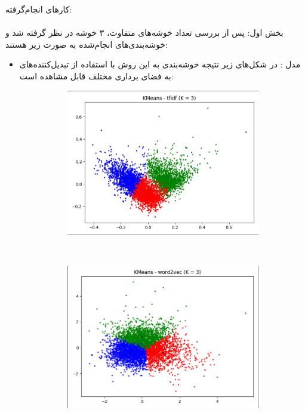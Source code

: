 \documentclass[11pt]{article}
\begin{document}
کارهای انجام‌گرفته: \\ \\
بخش اول: پس از بررسی تعداد خوشه‌های متفاوت، ۳ خوشه در نظر گرفته شد و خوشه‌بندی‌های انجام‌شده به صورت زیر هستند: \\
\begin{itemize}
\item 
مدل  : در شکل‌های زیر نتیجه خوشه‌بندی به این روش با استفاده از تبدیل‌کننده‌های به فضای برداری مختلف قابل مشاهده است: \\
\begin{figure}[H]
\begin{center}
\begin{subfigure}{0.4\textwidth}
\includegraphics[width=\textwidth]{pics/kmeans_tfidf.png}
\caption{}
\end{subfigure}
~
\begin{subfigure}{0.4\textwidth}
\includegraphics[width=\textwidth]{pics/kmeans_w2v.png}
\caption{}
\end{subfigure}
\end{center}
\end{figure}


\end{itemize}
\end{document}
